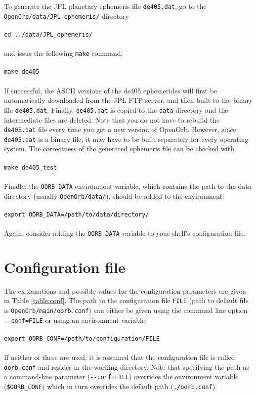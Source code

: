 \documentclass[12pt,english,twoside,a4paper]{report}
\begin{document}
To generate the JPL planetary ephemeris file \verb|de405.dat|, go to
the \\ \verb|OpenOrb/data/JPL_ephemeris/| directory \\ \\ 
\verb|cd ../data/JPL_ephemeris/| \\ \\ 
and issue the following \verb|make| command: \\ \\ 
\verb|make de405| \\ \\
If successful, the ASCII versions of the de405 ephemerides will first
be automatically downloaded from the JPL FTP server, and then built to
the binary file \verb|de405.dat|. Finally, \verb|de405.dat| is copied
to the \verb|data| directory and the intermediate files are
deleted. Note that you do not have to rebuild the \verb|de405.dat|
file every time you get a new version of OpenOrb. However, since
\verb|de405.dat| is a binary file, it may have to be built separately
for every operating system. The correctness of the generated ephemeris
file can be checked with \\ \\
\verb|make de405_test| \\ \\
Finally, the \verb|OORB_DATA| environment variable, which contains the
path to the data directory (usually \verb|OpenOrb/data/|), should be
added to the environment: \\ \\
\verb|export OORB_DATA=/path/to/data/directory/| \\ \\
Again, consider adding the \verb|OORB_DATA| variable to your shell's
configuration file. 


\section{Configuration file}

The explanations and possible values for the configuration parameters
are given in Table \ref{table:conf}. The path to the configuration
file \verb|FILE| (path to default file is
\verb|OpenOrb/main/oorb.conf|) can either be given using the command
line option \verb|--conf=FILE| or using an environment variable:
\\ \\ \verb|export OORB_CONF=/path/to/configuration/FILE| \\ \\ If
neither of these are used, it is assumed that the configuration file
is called \verb|oorb.conf| and resides in the working directory. Note
that specifying the path as a command-line parameter
(\verb|--conf=FILE|) overrides the environment variable
(\verb|$OORB_CONF|) which in turn overrides the default path
(\verb|./oorb.conf|).
\end{document}
